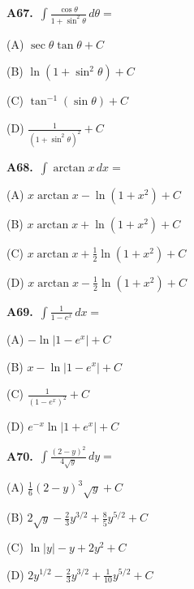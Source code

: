 \documentclass[11pt]{article}
\begin{document}
\bigskip\noindent\textbf{A67.}\ $\displaystyle\int \frac{\cos\theta}{1+\sin^2\theta}\,d\theta=$
\begin{list}{}{\setlength{\leftmargin}{3em}\setlength{\labelwidth}{2.5em}\setlength{\itemsep}{0pt}\setlength{\topsep}{2pt}}
\item[(A)] $\sec\theta\tan\theta+C$
\item[(B)] $\ln(1+\sin^2\theta)+C$
\item[(C)] $\tan^{-1}(\sin\theta)+C$
\item[(D)] $\frac1{(1+\sin^2\theta)^2}+C$
\end{list}

\bigskip\noindent\textbf{A68.}\ $\displaystyle\int \arctan x\,dx=$
\begin{list}{}{\setlength{\leftmargin}{3em}\setlength{\labelwidth}{2.5em}\setlength{\itemsep}{0pt}\setlength{\topsep}{2pt}}
\item[(A)] $x\arctan x-\ln(1+x^2)+C$
\item[(B)] $x\arctan x+\ln(1+x^2)+C$
\item[(C)] $x\arctan x+\frac12\ln(1+x^2)+C$
\item[(D)] $x\arctan x-\frac12\ln(1+x^2)+C$
\end{list}

\bigskip\noindent\textbf{A69.}\ $\displaystyle\int \frac1{1-e^x}\,dx=$
\begin{list}{}{\setlength{\leftmargin}{3em}\setlength{\labelwidth}{2.5em}\setlength{\itemsep}{0pt}\setlength{\topsep}{2pt}}
\item[(A)] $-\ln\lvert1-e^x\rvert+C$
\item[(B)] $x-\ln\lvert1-e^x\rvert+C$
\item[(C)] $\frac1{(1-e^x)^2}+C$
\item[(D)] $e^{-x}\ln\lvert1+e^x\rvert+C$
\end{list}

\bigskip\noindent\textbf{A70.}\ $\displaystyle\int \frac{(2-y)^2}{4\sqrt y}\,dy=$
\begin{list}{}{\setlength{\leftmargin}{3em}\setlength{\labelwidth}{2.5em}\setlength{\itemsep}{0pt}\setlength{\topsep}{2pt}}
\item[(A)] $\frac16(2-y)^3\sqrt y+C$
\item[(B)] $2\sqrt y-\frac23y^{3/2}+\frac85y^{5/2}+C$
\item[(C)] $\ln\lvert y\rvert-y+2y^2+C$
\item[(D)] $2y^{1/2}-\frac23y^{3/2}+\frac1{10}y^{5/2}+C$
\end{list}
\end{document}
